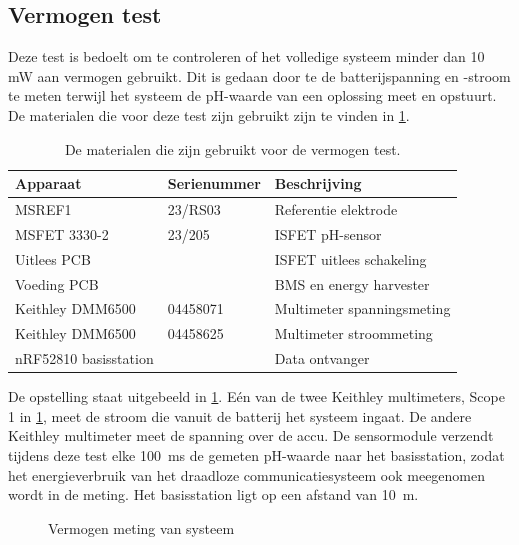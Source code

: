 \subsection{Vermogen test} \label{sec:vermogenTest}
Deze test is bedoelt om te controleren of het volledige systeem minder dan 10 mW aan vermogen gebruikt. Dit is gedaan door te de batterijspanning en -stroom te meten terwijl het systeem de pH-waarde van een oplossing meet en opstuurt. De materialen die voor deze test zijn gebruikt zijn te vinden in \cref{tab:testMaterialen3}.
\begin{table}[!htb]
    \centering
    \begin{tabular}{l|l|l}
        Apparaat         & Serienummer & Beschrijving \\
        \hline
        MSREF1           & 23/RS03     & Referentie elektrode       \\
        MSFET 3330-2     & 23/205      & ISFET pH-sensor            \\
        Uitlees PCB      &             & ISFET uitlees schakeling   \\
        Voeding PCB      &             & BMS en energy harvester    \\
        Keithley DMM6500 & 04458071    & Multimeter spanningsmeting \\
        Keithley DMM6500 & 04458625    & Multimeter stroommeting    \\
        nRF52810 basisstation &        & Data ontvanger \\
        \hline
    \end{tabular}
    \caption{De materialen die zijn gebruikt voor de vermogen test.}
    \label{tab:testMaterialen3}
\end{table}
De opstelling staat uitgebeeld in \cref{fig:vermogenMetingOpstelling}. Eén van de twee Keithley multimeters, Scope 1 in \cref{fig:vermogenMetingOpstelling}, meet de stroom die vanuit de batterij het systeem ingaat. De andere Keithley multimeter meet de spanning over de accu. De sensormodule verzendt tijdens deze test elke \qty{100}{\milli\second} de gemeten pH-waarde naar het basisstation, zodat het energieverbruik van het draadloze communicatiesysteem ook meegenomen wordt in de meting. Het basisstation ligt op een afstand van \qty{10}{\meter}.


\begin{figure}[!htb]
    \centering
    \def\svgwidth{0.6\textwidth}
    
    \caption{Vermogen meting van systeem}
    \label{fig:vermogenMetingOpstelling}
\end{figure}

